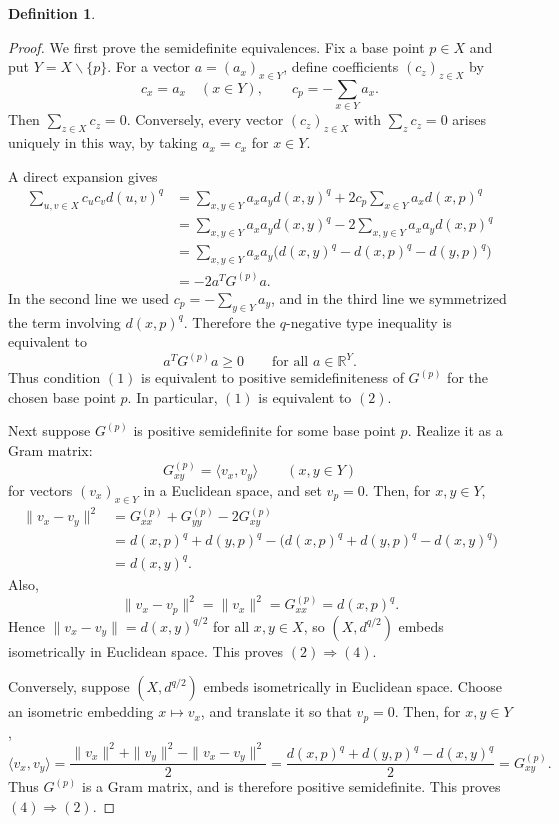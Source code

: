 \documentclass[12pt]{amsart}
\theoremstyle{definition}
\newtheorem{definition}[theorem]{Definition}
\newcommand{\1}{\mathbf{1}}
\renewcommand{\setminus}{\backslash}
\begin{document}
\begin{definition}
\begin{proof}
We first prove the semidefinite equivalences. Fix a base point $p\in X$ and
put $Y=X\setminus\{p\}$. For a vector $a=(a_x)_{x\in Y}$, define coefficients
$(c_z)_{z\in X}$ by
\[
        c_x=a_x \quad (x\in Y),
        \qquad
        c_p=-\sum_{x\in Y} a_x .
\]
Then $\sum_{z\in X}c_z=0$. Conversely, every vector $(c_z)_{z\in X}$ with
$\sum_z c_z=0$ arises uniquely in this way, by taking $a_x=c_x$ for
$x\in Y$.

A direct expansion gives
\[
\begin{aligned}
        \sum_{u,v\in X} c_uc_v d(u,v)^q
        &=
        \sum_{x,y\in Y} a_xa_y d(x,y)^q
        +2c_p\sum_{x\in Y} a_x d(x,p)^q  \\
        &=
        \sum_{x,y\in Y} a_xa_y d(x,y)^q
        -2\sum_{x,y\in Y} a_xa_y d(x,p)^q  \\
        &=
        \sum_{x,y\in Y} a_xa_y
        \bigl(d(x,y)^q-d(x,p)^q-d(y,p)^q\bigr)  \\
        &=
        -2 a^T G^{(p)} a .
\end{aligned}
\]
In the second line we used $c_p=-\sum_{y\in Y}a_y$, and in the third line
we symmetrized the term involving $d(x,p)^q$. Therefore the $q$-negative
type inequality is equivalent to
\[
        a^T G^{(p)}a\ge 0
        \qquad\text{for all } a\in\mathbb{R}^{Y}.
\]
Thus condition $(1)$ is equivalent to positive semidefiniteness of
$G^{(p)}$ for the chosen base point $p$. In particular, $(1)$ is equivalent
to $(2)$.

Next suppose $G^{(p)}$ is positive semidefinite for some base point $p$.
Realize it as a Gram matrix:
\[
        G^{(p)}_{xy}=\langle v_x,v_y\rangle
        \qquad (x,y\in Y)
\]
for vectors $(v_x)_{x\in Y}$ in a Euclidean space, and set $v_p=0$. Then,
for $x,y\in Y$,
\[
\begin{aligned}
        \|v_x-v_y\|^2
        &=
        G^{(p)}_{xx}+G^{(p)}_{yy}-2G^{(p)}_{xy}  \\
        &=
        d(x,p)^q+d(y,p)^q
        -\bigl(d(x,p)^q+d(y,p)^q-d(x,y)^q\bigr)  \\
        &=
        d(x,y)^q.
\end{aligned}
\]
Also,
\[
        \|v_x-v_p\|^2=\|v_x\|^2=G^{(p)}_{xx}=d(x,p)^q .
\]
Hence $\|v_x-v_y\|=d(x,y)^{q/2}$ for all $x,y\in X$, so
$(X,d^{q/2})$ embeds isometrically in Euclidean space. This proves
$(2)\Longrightarrow (4)$.

Conversely, suppose $(X,d^{q/2})$ embeds isometrically in Euclidean space.
Choose an isometric embedding $x\mapsto v_x$, and translate it so that
$v_p=0$. Then, for $x,y\in Y$,
\[
        \langle v_x,v_y\rangle
        =
        \frac{\|v_x\|^2+\|v_y\|^2-\|v_x-v_y\|^2}{2}
        =
        \frac{d(x,p)^q+d(y,p)^q-d(x,y)^q}{2}
        =
        G^{(p)}_{xy}.
\]
Thus $G^{(p)}$ is a Gram matrix, and is therefore positive semidefinite.
This proves $(4)\Longrightarrow (2)$.


\end{proof}
\end{definition}
\end{document}

